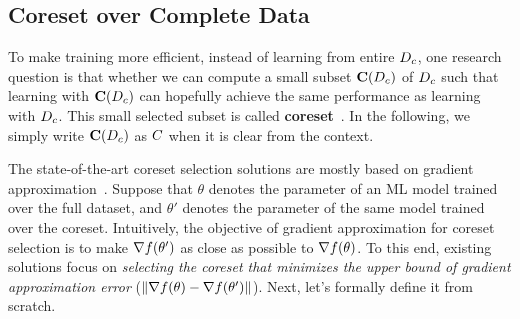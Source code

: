 

\subsection{Coreset over Complete Data}
\label{subset:sigletable}

 To make training more efficient, instead of learning from entire $D_c$, one research question  is that whether we can compute a small subset $\mathbf{C}(D_c)$ of $D_c$ such that learning with $\mathbf{C}(D_c)$ can hopefully achieve the same performance as learning with $D_c$.
%
This small selected subset is called {\bf coreset}~\cite{DBLP:journals/corr/abs-2011-09384,munteanu2018coresets}.
%
In the following, we simply write $\mathbf{C}(D_c)$ as $C$ when it is clear from the context.

The state-of-the-art coreset selection solutions are mostly based on gradient approximation~\cite{DBLP:conf/aaai/KillamsettySRI21, DBLP:conf/icml/MirzasoleimanBL20}.
Suppose that $\theta$ denotes the parameter of an ML model trained over the full dataset, and $\theta'$ denotes the parameter of the same model trained over  the coreset.   Intuitively,   the objective of gradient approximation for coreset selection is to make $\nabla f(\theta')$ as close as possible to $\nabla f(\theta)$. To this end, existing solutions focus on \textit{selecting the coreset that  minimizes the upper bound of gradient approximation error} ($\lVert  \nabla f(\theta) - \nabla f(\theta')  \rVert$). Next, let's formally define it from scratch.
%






